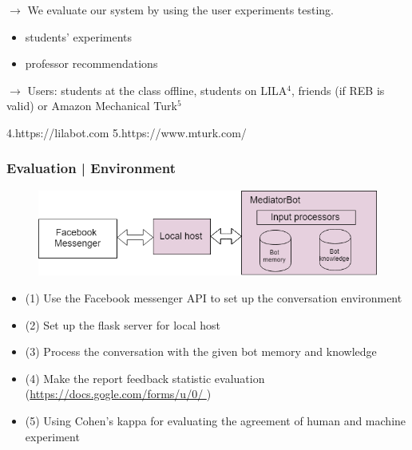 \documentclass{beamer}
\begin{document}
\begin{frame}
{\scriptsize  $\rightarrow$  We evaluate our system by using the user experiments testing. 
	\begin{itemize}
		\item students' experiments
		\item professor recommendations
	\end{itemize}
	$\rightarrow$ Users: students at the class offline, students on LILA$^4$, friends (if REB is valid) or Amazon Mechanical Turk$^5$}

\begin{flushleft}
	
	{\tiny 4.https://lilabot.com             }
	{\tiny 	 5.https://www.mturk.com/}
\end{flushleft}

\end{frame}

\begin{frame}
\frametitle{Evaluation | Environment}
\begin{figure}
	\includegraphics[width=.8\textwidth]{ue1.png}
\end{figure}
\begin{itemize}
	\item {\scriptsize (1) Use the Facebook messenger API to set up the conversation environment}
	\item {\scriptsize (2) Set up the flask server for local host }
	\item {\scriptsize (3) Process the conversation with the given bot memory and knowledge }
	\item {\scriptsize (4) Make the report feedback statistic evaluation (\url{https://docs.gogle.com/forms/u/0/ })}
	\item {\scriptsize (5) Using Cohen's kappa for evaluating the agreement of human and machine experiment }
\end{itemize}


\end{frame}
\end{document}
